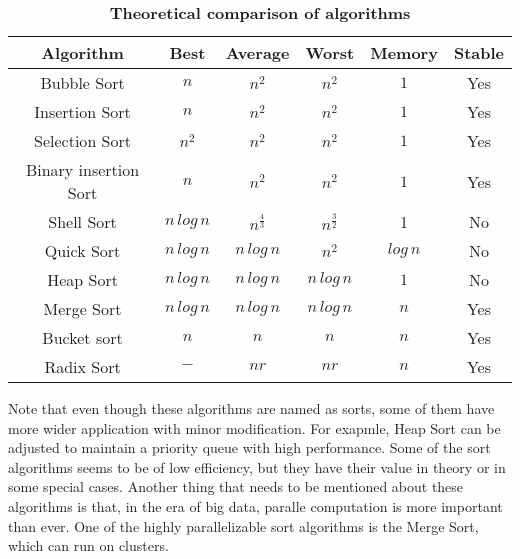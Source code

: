 \documentclass[cn,black,12pt,normal]{elegantnote}
\newcommand{\uct}[1]{\textsuperscript{\textsuperscript{\cite{#1}}}}
\begin{document}
\begin{table}[H]
    \caption{\textbf{Theoretical comparison of algorithms}}
    \centering
    \begin{tabular}{cccccc}
        \toprule
        Algorithm&Best&Average&Worst&Memory&Stable\\
        \midrule
        Bubble Sort&$n$&$n^2$&$n^2$&$1$&Yes\\
        Insertion Sort&$n$&$n^2$&$n^2$&$1$&Yes\\
        Selection Sort&$n^2$&$n^2$&$n^2$&$1$&Yes\\
        Binary insertion Sort&$n$&$n^2$&$n^2$&$1$&Yes\\
        Shell Sort&$n \, log \, n$&$n^{\frac{4}{3}}$&$n^{\frac{3}{2}}$&1&No\\
        Quick Sort&$n \, log \, n$&$n \, log \, n$&$n^2$&$log \, n$&No\\
        Heap Sort&$n \, log \, n$&$n \, log \, n$&$n \, log \, n$&$1$&No\\
        Merge Sort&$n \, log \, n$&$n \, log \, n$&$n \, log \, n$&$n$&Yes\\
        Bucket sort&$n$&$n$&$n$&$n$&Yes\\
        Radix Sort&$-$&$nr$&$nr$&$n$&Yes\\
        \bottomrule
    \end{tabular}
\end{table}

Note that even though these algorithms are named as sorts, some of them have more wider application with minor modification. For exapmle, Heap Sort can be adjusted to maintain a priority queue with high performance. Some of the sort algorithms seems to be of low efficiency, but they have their value in theory or in some special cases. Another thing that needs to be mentioned about these algorithms is that, in the era of big data, paralle computation is more important than ever. One of the highly parallelizable sort algorithms is the Merge Sort, which can run on clusters.\uct{ajtai19830}



\end{document}
